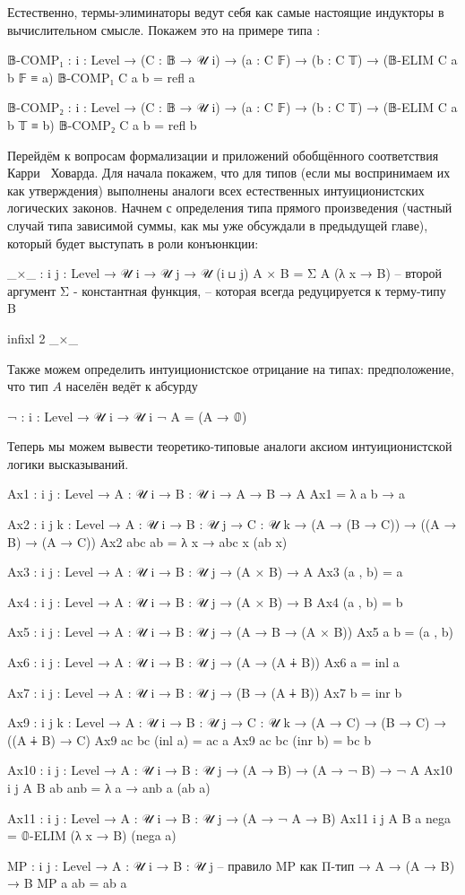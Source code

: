 \documentclass{article}[12pt]
\newcommand{\dash}{\textemdash\ }
\begin{document}
Естественно, термы-элиминаторы ведут себя как самые настоящие индукторы в вычислительном
смысле. Покажем это на примере типа :
\begin{code}
𝔹-COMP₁ : {i : Level} → (C : 𝔹 → 𝒰 i)
          → (a : C 𝔽)
          → (b : C 𝕋)
          → (𝔹-ELIM C a b 𝔽 ≡ a)
𝔹-COMP₁ C a b = refl a

𝔹-COMP₂ : {i : Level} → (C : 𝔹 → 𝒰 i)
          → (a : C 𝔽)
          → (b : C 𝕋)
          → (𝔹-ELIM C a b 𝕋 ≡ b)
𝔹-COMP₂ C a b = refl b
\end{code}

Перейдём к вопросам формализации и приложений обобщённого соответствия Карри \dash Ховарда.
Для начала покажем, что для типов (если мы воспринимаем их как утверждения) выполнены аналоги
всех естественных интуиционистских логических законов. Начнем с определения
типа прямого произведения (частный случай типа зависимой суммы, как мы уже обсуждали в предыдущей главе),
который будет выступать в роли конъюнкции:
\begin{code}
_×_ : {i j : Level} → 𝒰 i → 𝒰 j → 𝒰 (i ⊔ j)
A × B = Σ A (λ x → B) -- второй аргумент Σ - константная функция,
-- которая всегда редуцируется к терму-типу B

infixl 2 _×_
\end{code}
Также можем определить интуиционистское отрицание на типах: предположение, что тип $A$ населён
ведёт к абсурду
\begin{code}
¬ : {i : Level} → 𝒰 i → 𝒰 i
¬ A = (A → 𝟘)
\end{code}
Теперь мы можем вывести теоретико-типовые аналоги аксиом интуиционистской логики высказываний.
\begin{code}
Ax1 : {i j : Level} → {A : 𝒰 i} → {B : 𝒰 i}
      → A → B → A
Ax1 = λ a b → a

Ax2 : {i j k : Level} → {A : 𝒰 i} → {B : 𝒰 j} → {C : 𝒰 k}
      → (A → (B → C)) → ((A → B) → (A → C))
Ax2 abc ab = λ x → abc x (ab x)

Ax3 : {i j : Level} → {A : 𝒰 i} → {B : 𝒰 j}
      → (A × B) → A
Ax3 (a , b) = a

Ax4 : {i j : Level} → {A : 𝒰 i} → {B : 𝒰 j}
      → (A × B) → B
Ax4 (a , b) = b

Ax5 : {i j : Level} → {A : 𝒰 i} → {B : 𝒰 j}
      → (A → B → (A × B))
Ax5 a b = (a , b)

Ax6 : {i j : Level} → {A : 𝒰 i} → {B : 𝒰 j}
      → (A → (A ∔ B))
Ax6 a = inl a

Ax7 : {i j : Level} → {A : 𝒰 i} → {B : 𝒰 j}
      → (B → (A ∔ B))
Ax7 b = inr b

Ax9 : {i j k : Level} → {A : 𝒰 i} → {B : 𝒰 j} → {C : 𝒰 k}
      → (A → C) → (B → C) → ((A ∔ B) → C)
Ax9 ac bc (inl a) = ac a
Ax9 ac bc (inr b) = bc b

Ax10 : {i j : Level} → {A : 𝒰 i} → {B : 𝒰 j}
       → (A → B) → (A → ¬ B) → ¬ A
Ax10 {i} {j} {A} {B} ab anb = λ a → anb a (ab a)

Ax11 : {i j : Level} → {A : 𝒰 i} → {B : 𝒰 j}
       → (A → ¬ A → B)
Ax11 {i} {j} {A} {B} a nega = 𝟘-ELIM (λ x → B) (nega a)

MP : {i j : Level} → {A : 𝒰 i} → {B : 𝒰 j} -- правило MP как Π-тип
     → A → (A → B) → B
MP a ab = ab a
\end{code}
\end{document}
